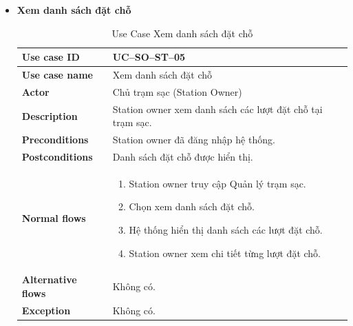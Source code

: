 \begin{enumerate}[label=\textbf{\alph*)}]
\begin{itemize}
  \item \textbf{Xem danh sách đặt chỗ}
    \begin{center}
      \renewcommand{\arraystretch}{1.5}
      \begin{longtable}{|m{}|m{}|}
          \caption{Use Case Xem danh sách đặt chỗ}
        \label{tab:uc_so_st_05} \\
        \hline
        \textbf{Use case ID} & UC--SO--ST--05 \\
        \hline
        \textbf{Use case name} & Xem danh sách đặt chỗ \\
        \hline
        \textbf{Actor} & Chủ trạm sạc (Station Owner) \\
        \hline
        \textbf{Description} & Station owner xem danh sách các lượt đặt chỗ tại trạm sạc. \\
        \hline
        \textbf{Preconditions} &
        Station owner đã đăng nhập hệ thống.\\
        \hline
        \textbf{Postconditions} &
        Danh sách đặt chỗ được hiển thị.\\
        \hline
        \textbf{Normal flows} &
        \begin{enumerate}[label=\arabic*.]
          \item Station owner truy cập Quản lý trạm sạc.
          \item Chọn xem danh sách đặt chỗ.
          \item Hệ thống hiển thị danh sách các lượt đặt chỗ.
          \item Station owner xem chi tiết từng lượt đặt chỗ.
        \end{enumerate}\\
        \hline
        \textbf{Alternative flows} &
        Không có.\\
        \hline
        \textbf{Exception} &
        Không có.\\
        \hline
        \end{longtable}
    \end{center}
\end{itemize}


\end{enumerate}
